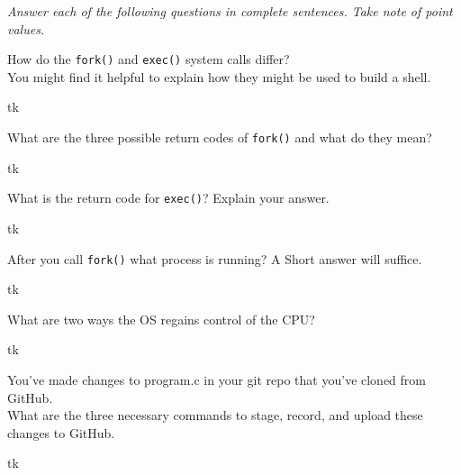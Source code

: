 \documentclass[letterpaper,
addpoints]{exam}
\begin{document}
	\begin{center}
	\parbox{5.5in}{\centering\itshape Answer each of the following questions in complete sentences. 
			Take note of point values.}
	\end{center}

	\begin{questions}

	\question[4]
		How do the \texttt{fork()} and \texttt{exec()} system calls differ? \\
		You might find it helpful to explain how they might be used to build a shell.
		\vspace{.5in}


		\begin{solution}[\stretch{1}]
			tk
		\end{solution}

	\question[3]
		What are the three possible return codes of \texttt{fork()} and what do they mean?


		\begin{solution}[\stretch{1}]
			tk
		\end{solution}

	\question[2]
		What is the return code for \texttt{exec()}? Explain your answer.


		\begin{solution}[\stretch{1}]
			tk
		\end{solution}

	\question[1]
		After you call \texttt{fork()} what process is running? A Short answer will suffice.


		\begin{solution}[\stretch{1}]
			tk
		\end{solution}

	\question[2]
		What are two ways the OS regains control of the CPU?


		\begin{solution}[\stretch{1}]
			tk
		\end{solution}

	\question[3]
		You've made changes to program.c in your git repo that you've cloned from GitHub. \\
		What are the three necessary commands to stage, record, and upload these changes to GitHub.


		\begin{solution}[\stretch{1}]
			tk
		\end{solution}

	\newpage
	\end{questions}
\end{document}
